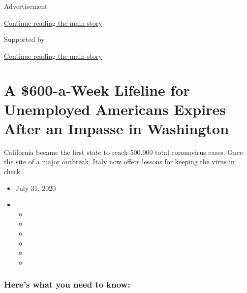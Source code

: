 Advertisement

\protect\hyperlink{after-top}{Continue reading the main story}

Supported by

\protect\hyperlink{after-sponsor}{Continue reading the main story}

\hypertarget{a-600-a-week-lifeline-for-unemployed-americans-expires-after-an-impasse-in-washington}{%
\section{A \$600-a-Week Lifeline for Unemployed Americans Expires After
an Impasse in
Washington}\label{a-600-a-week-lifeline-for-unemployed-americans-expires-after-an-impasse-in-washington}}

California became the first state to reach 500,000 total coronavirus
cases. Once the site of a major outbreak, Italy now offers lessons for
keeping the virus in check.

\begin{itemize}
\item
  July 31, 2020
\item
  \begin{itemize}
  \item
  \item
  \item
  \item
  \item
  \item
  \end{itemize}
\end{itemize}

\hypertarget{heres-what-you-need-to-know}{%
\subsubsection{Here's what you need to
know:}\label{heres-what-you-need-to-know}}

